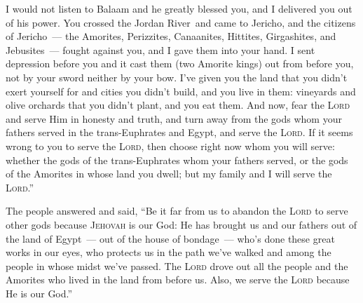 \begin{inparaenum}
   I would not listen to Balaam and he greatly blessed you, and I delivered you out of his power.%
   You crossed the Jordan River\understood\ and came to Jericho, and the citizens of Jericho~--- the Amorites, Perizzites, Canaanites, Hittites, Girgashites, and Jebusites~--- fought against you, and I gave them into your hand.%
   I sent depression before you and it cast them (two Amorite kings) out from before you, not by your sword neither by your bow.%
   I've given you the land that you didn't exert yourself for and cities you didn't build, and you live in them: vineyards and olive orchards that you didn't plant, and you eat them.\understood%
   And now, fear the \textsc{Lord} and serve Him in honesty and truth, and turn away from the gods whom your fathers served in the trans-Euphrates and Egypt, and serve the \textsc{Lord}.%
   If it seems wrong to you to serve the \textsc{Lord}, then choose right now whom you will serve: whether the gods of the trans-Euphrates whom your fathers served, or the gods of the Amorites in whose land you dwell; but my family and I will serve the \textsc{Lord}.''%
  
   The people answered and said, ``Be it far from us to abandon the \textsc{Lord} to serve other gods%
   because \textsc{Jehovah} is our God: He has brought us and our fathers out of the land of Egypt~--- out of the house of bondage~--- who's done these great works in our eyes, who protects us in the path we've walked and among the people in whose midst we've passed.%
   The \textsc{Lord} drove out all the people and the Amorites who lived in the land from before us. Also, we serve the \textsc{Lord} because He is our God.''%
  

\end{inparaenum}
